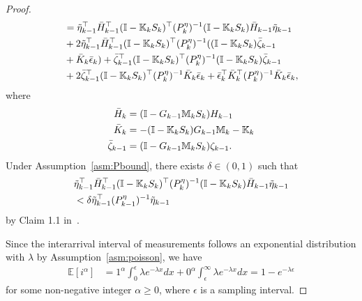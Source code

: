 \documentclass[letterpaper, 10 pt, conference]{ieeeconf}
\begin{document}
\begin{proof}
\begin{align}
&=\tilde{\eta}_{k-1}^\top \bar{H}_{k-1}^\top (\mathbb{I}-\mathbb{K}_kS_k)^\top (P_k^{\eta})^{-1}
(\mathbb{I}-\mathbb{K}_kS_k) \bar{H}_{k-1} \tilde{\eta}_{k-1}\nonumber\\
&+2\tilde{\eta}_{k-1}^\top \bar{H}_{k-1}^\top (\mathbb{I}-\mathbb{K}_kS_k)^\top (P_k^{\eta})^{-1} ((\mathbb{I}-\mathbb{K}_kS_k) \bar{\zeta}_{k-1}\nonumber\\
&+\bar{K}_k \bar{\epsilon}_k)+\bar{\zeta}_{k-1}^\top (\mathbb{I}-\mathbb{K}_kS_k)^\top (P_k^{\eta})^{-1} (\mathbb{I}-\mathbb{K}_kS_k) \bar{\zeta}_{k-1}\nonumber\\
&+2\bar{\zeta}_{k-1}^\top (\mathbb{I}-\mathbb{K}_kS_k)^\top (P_k^{\eta})^{-1}\bar{K}_k \bar{\epsilon}_k+ \bar{\epsilon}_k^\top \bar{K}_k^\top (P_k^{\eta})^{-1} \bar{K}_k \bar{\epsilon}_k,
\label{eq:V}
\end{align}
where
\begin{align*}
    \bar{H}_k &= (\mathbb{I}-G_{k-1} \mathbb{M}_kS_k)H_{k-1}\nonumber\\
    \bar{K}_k &=-(\mathbb{I}-\mathbb{K}_kS_k)G_{k-1} \mathbb{M}_k-\mathbb{K}_k\nonumber\\
    \bar{\zeta}_{k-1} &=(\mathbb{I}-G_{k-1} \mathbb{M}_kS_k)\zeta_{k-1}.
\end{align*}
Under Assumption~\ref{asm:Pbound}, there exists $\delta \in (0,1)$ such that
\begin{align}
&\tilde{\eta}_{k-1}^\top \bar{H}_{k-1}^\top (\mathbb{I}-\mathbb{K}_kS_k)^\top (P_k^{\eta})^{-1}
(\mathbb{I}-\mathbb{K}_kS_k) \bar{H}_{k-1} \tilde{\eta}_{k-1}\nonumber\\
&<\delta \tilde{\eta}_{k-1}^\top (P_{k-1}^\eta)^{-1} \tilde{\eta}_{k-1}
\label{eq:Vdi1}
\end{align}
by Claim 1.1 in~\cite{wan2019attackArx}.

Since the interarrival interval of measurements follows an exponential distribution with $\lambda$ by Assumption~\ref{asm:poisson}, we have
\begin{align*}
    \mathbb{E}[i^\alpha]&=1^\alpha\int_0^\epsilon \lambda e^{-\lambda x}dx +0^\alpha\int_\epsilon^\infty \lambda e^{-\lambda x}dx= 1-e^{-\lambda \epsilon}
\end{align*}
for some non-negative integer $\alpha \geq0$, where $\epsilon$ is a sampling interval.


\end{proof}
\end{document}
